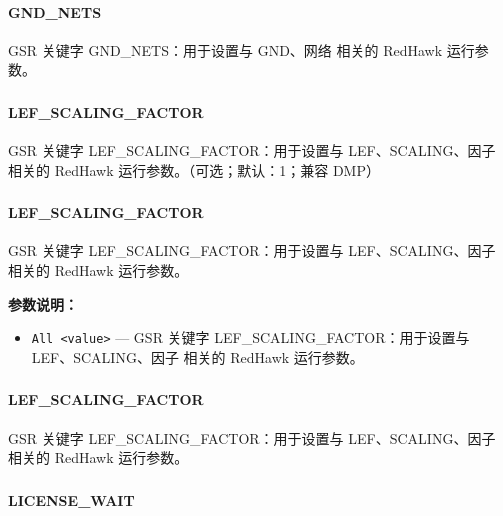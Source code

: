 \paragraph*{GND_NETS}

GSR 关键字 GND_NETS：用于设置与 GND、网络 相关的 RedHawk 运行参数。

\subsubsection{}
\paragraph*{LEF_SCALING_FACTOR}

GSR 关键字 LEF_SCALING_FACTOR：用于设置与 LEF、SCALING、因子 相关的 RedHawk 运行参数。（可选；默认：1；兼容 DMP）

\subsubsection{}
\paragraph*{LEF_SCALING_FACTOR}

GSR 关键字 LEF_SCALING_FACTOR：用于设置与 LEF、SCALING、因子 相关的 RedHawk 运行参数。

\textbf{参数说明：}
\begin{itemize}
\item \texttt{All <value>} — GSR 关键字 LEF\_SCALING\_FACTOR：用于设置与 LEF、SCALING、因子 相关的 RedHawk 运行参数。
\end{itemize}

\subsubsection{}
\paragraph*{LEF_SCALING_FACTOR}

GSR 关键字 LEF_SCALING_FACTOR：用于设置与 LEF、SCALING、因子 相关的 RedHawk 运行参数。

\subsubsection{}
\paragraph*{LICENSE_WAIT}

